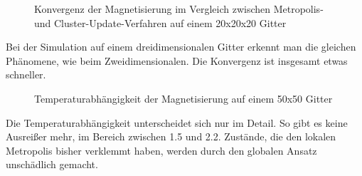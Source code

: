 \begin{figure}[H]
	\centering
	\caption{Konvergenz der Magnetisierung im Vergleich zwischen Metropolis- und Cluster-Update-Verfahren auf einem 20x20x20 Gitter}
	\label{cu2d3steps}
\end{figure}

Bei der Simulation auf einem dreidimensionalen Gitter erkennt man die gleichen Phänomene, wie beim Zweidimensionalen. Die Konvergenz ist insgesamt etwas schneller.

\begin{figure}[H]
	\centering
	\caption{Temperaturabhängigkeit der Magnetisierung auf einem 50x50 Gitter}
	\label{}
\end{figure}

Die Temperaturabhängigkeit unterscheidet sich nur im Detail. So gibt es keine Ausreißer mehr, im Bereich zwischen 1.5 und 2.2. Zustände, die den lokalen Metropolis bisher verklemmt haben, werden durch den globalen Ansatz unschädlich gemacht. 
